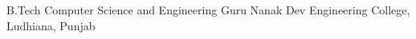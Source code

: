    {B.Tech}
    {Computer Science and Engineering}
    {Guru Nanak Dev Engineering College, Ludhiana, Punjab}
    {}
    {}
